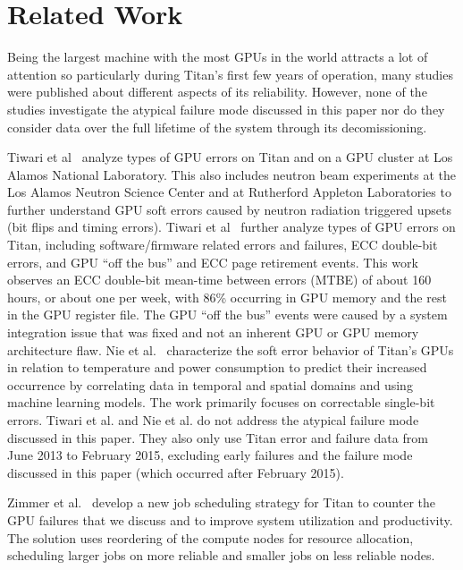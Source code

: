 \section{Related Work}
\label{section:related}

Being the largest machine with the most GPUs in the world attracts a lot of attention so particularly during Titan's first few years of operation, many studies were published about different aspects of its reliability. However, none of the studies investigate the atypical failure mode discussed in this paper nor do they consider data over the full lifetime of the system through its decomissioning.

Tiwari et al~\cite{Tiwari15Experience,7056044} analyze types of GPU errors on Titan and on a GPU cluster at Los Alamos National Laboratory. This also includes neutron beam experiments at the Los Alamos Neutron Science Center and at Rutherford Appleton Laboratories to further understand GPU soft errors caused by neutron radiation triggered upsets (bit flips and timing errors).
%
Tiwari et al~\cite{10.1145/2807591.2807666} further analyze types of GPU errors on Titan, including software/firmware related errors and failures, ECC double-bit errors, and GPU ``off the bus'' and ECC page retirement events. This work observes an ECC double-bit mean-time between errors (MTBE) of about 160 hours, or about one per week, with 86\% occurring in GPU memory and the rest in the GPU register file. The GPU ``off the bus'' events were caused by a system integration issue that was fixed and not an inherent GPU or GPU memory architecture flaw.
%
Nie et al.~\cite{7446091,nie17characterizing,nie18machine} characterize the soft error behavior of Titan's GPUs in relation to temperature and power consumption to predict their increased occurrence by correlating data in temporal and spatial domains and using machine learning models. The work primarily focuses on correctable single-bit errors.
%
Tiwari et al. and Nie et al. do not address the atypical failure mode discussed in this paper. They also only use Titan error and failure data from June 2013 to February 2015, excluding early failures and the failure mode discussed in this paper (which occurred after February 2015).

Zimmer et al.~\cite{8665764} develop a new job scheduling strategy for Titan to counter the GPU failures that we discuss and to improve system utilization and productivity. The solution uses reordering of the compute nodes for resource allocation, scheduling larger jobs on more reliable and smaller jobs on less reliable nodes.

